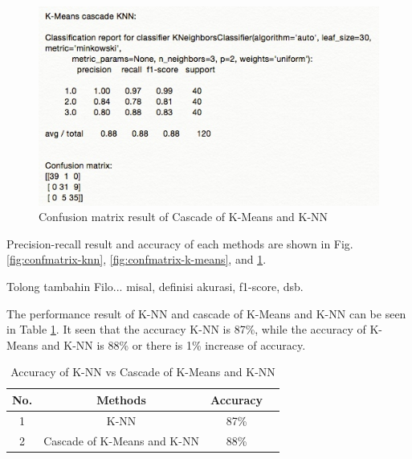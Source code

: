\documentclass[conference]{IEEEtran}
\begin{document}
\begin{figure}[!t]
\centering
\includegraphics[width=3.2 in]{confmat_cascade.jpg}
\caption{Confusion matrix result of Cascade of K-Means and K-NN}
\label{fig:confmatrix-cascade}
\end{figure}



Precision-recall result and accuracy of each methods are shown in Fig. \ref{fig:confmatrix-knn}, \ref{fig:confmatrix-k-means}, and \ref{fig:confmatrix-cascade}. 

Tolong tambahin Filo... misal, definisi akurasi, f1-score, dsb.  




The performance result of K-NN and cascade of K-Means and K-NN can be seen in Table \ref{table_result}. It seen that the accuracy K-NN is 87\%, while the accuracy of K-Means and K-NN is 88\% or there is 1\% increase of accuracy. 

\begin{table}[!t]
\renewcommand{\arraystretch}{1.3}
\centering
\caption{Accuracy of K-NN vs Cascade of K-Means and K-NN}
\label{table_result}
\begin{tabular}{|c|c|c|c|}
\hline
No. & Methods & Accuracy\\
\hline
1 & K-NN & 87\%\\
\hline
2 & Cascade of K-Means and K-NN & 88\%\\
\hline
\end{tabular}
\end{table}
\end{document}
